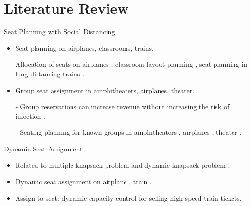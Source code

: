 
\section{Literature Review}
    \frame{\sectionpage}
    \begin{frame}{Seat Planning with Social Distancing}
      \begin{itemize}
        \item Seat planning on airplanes, classrooms, trains.

        Allocation of seats on airplanes \cite{ghorbani2020model}, classroom layout planning \cite{bortolete2022support}, seat planning in long-distancing trains \cite{haque2022optimization}.
        \vspace*{0.5cm}
        \item Group seat assignment in amphitheaters, airplanes, theater.

        \item[-] Group reservations can increase revenue without increasing the risk of infection \cite{moore2021seat}.
        \vspace*{0.5cm}

        \item[-] Seating planning for known groups in amphitheaters \cite{haque2022optimization}, airplanes \cite{salari2022social}, theater \cite{blom2022filling}.
      \end{itemize}
      \end{frame}
      
      \begin{frame}{Dynamic Seat Assignment}
        \begin{itemize}
          \item Related to multiple knapsack problem \cite{pisinger1999exact} and dynamic knapsack problem \cite{kleywegt1998dynamic}.
          \vspace*{0.5cm}
          \item Dynamic seat assignment on airplane \cite{hamdouch2011schedule}, train \cite{berge1993demand, zhu2023assign}.
          \vspace*{0.5cm}
          \item Assign-to-seat: dynamic capacity control for selling high-speed train tickets. \cite{zhu2023assign}
        \end{itemize}
      \end{frame}